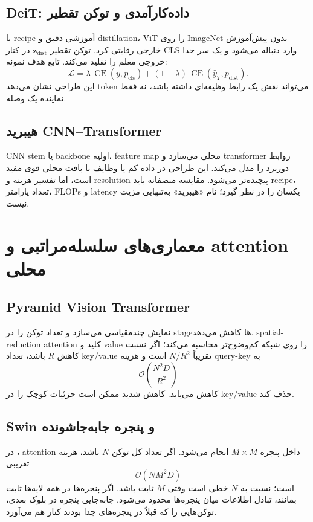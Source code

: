 \documentclass[12pt,openany,oneside]{book}
\newcommand{\vect}[1]{\bm{#1}}
\newcommand{\CE}{\operatorname{CE}}
\begin{document}
\subsection{DeiT: داده‌کارآمدی و توکن تقطیر}
 با recipe آموزشی دقیق و distillation، ViT را روی ImageNet بدون پیش‌آموزش خارجی رقابتی کرد. توکن تقطیر $\vect z_{\mathrm{dist}}$ در کنار CLS وارد دنباله می‌شود و یک سر جدا خروجی معلم را تقلید می‌کند. تابع هدف نمونه:
\begin{equation}
\mathcal L=\lambda\,\CE(y,p_{\mathrm{cls}})+(1-\lambda)\,\CE(\widehat y_T,p_{\mathrm{dist}}).
\end{equation}
این طراحی نشان می‌دهد token می‌تواند نقش یک رابط وظیفه‌ای داشته باشد، نه فقط نماینده یک وصله.

\subsection{هیبرید CNN--Transformer}
CNN stem یا backbone اولیه، feature map محلی می‌سازد و transformer روابط دوربرد را مدل می‌کند. این طراحی در داده کم یا وظایف با بافت محلی قوی مفید است، اما تفسیر هزینه و resolution پیچیده‌تر می‌شود. مقایسه منصفانه باید recipe، تعداد پارامتر، FLOPs و latency یکسان را در نظر گیرد؛ نام «هیبرید» به‌تنهایی مزیت نیست.

\section{معماری‌های سلسله‌مراتبی و attention محلی}
\subsection{Pyramid Vision Transformer}
 نمایش چندمقیاسی می‌سازد و تعداد توکن را در stageها کاهش می‌دهد. spatial-reduction attention کلید و value را روی شبکه کم‌وضوح‌تر محاسبه می‌کند؛ اگر نسبت کاهش $R$ باشد، تعداد key/value تقریباً $N/R^2$ است و هزینه query-key به
\begin{equation}
\mathcal O\!\left(\frac{N^2D}{R^2}\right)
\end{equation}
کاهش می‌یابد. کاهش شدید ممکن است جزئیات کوچک را در key/value حذف کند.

\subsection{Swin و پنجره جابه‌جا‌شونده}
در ، attention داخل پنجره $M\times M$ انجام می‌شود. اگر تعداد کل توکن $N$ باشد، هزینه تقریبی
\begin{equation}
\mathcal O(NM^2D)
\end{equation}
است؛ نسبت به $N$ خطی است وقتی $M$ ثابت باشد. اگر پنجره‌ها در همه لایه‌ها ثابت بمانند، تبادل اطلاعات میان پنجره‌ها محدود می‌شود. جابه‌جایی پنجره در بلوک بعدی، توکن‌هایی را که قبلاً در پنجره‌های جدا بودند کنار هم می‌آورد.
\end{document}
